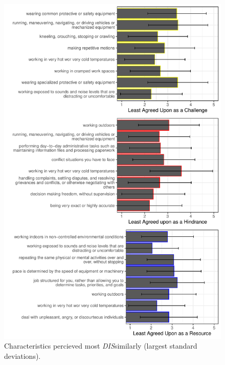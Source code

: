 \documentclass[
  man,mask]{apa6}
\begin{document}
\begin{figure}
\centering
\includegraphics{Submission_files/figure-latex/combinegraphs2-1.pdf}
\caption{\label{fig:combinegraphs2}Characteristics percieved most \emph{DIS}similarly (largest standard deviations).}
\end{figure}
\end{document}
